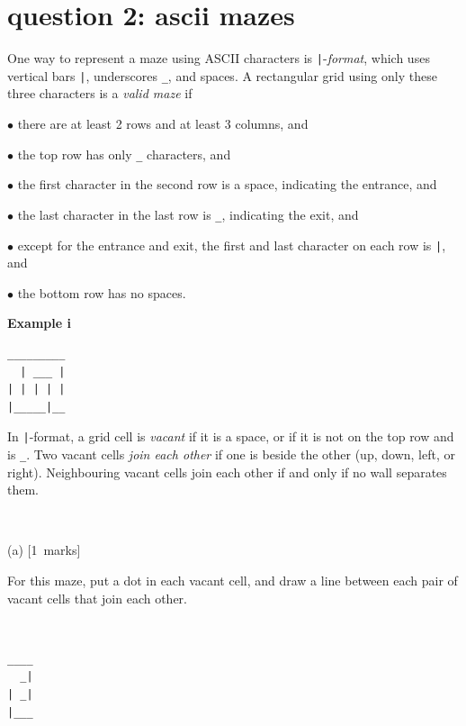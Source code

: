 \documentclass[12pt]{article}
\newcommand{\mymarks}[1]{\mbox{\small [#1 marks]}}
\begin{document}
\vfill
\vfill


\newpage
\section*{question 2: ascii mazes}

One way to represent a maze using ASCII characters is
\texttt{|}-{\em format}, which uses 
vertical bars \verb&|&, underscores \verb&_&, and spaces.
A rectangular grid using only these three 
characters is a {\em valid maze} if

$\bullet$ there are at least 2 rows and at least 3 columns, and

$\bullet$ the top row has only \verb&_& characters, and

$\bullet$ the first character in the second row 
is a space, indicating the entrance, and

$\bullet$ the last character in the last row is \verb&_&,
indicating the exit, and

$\bullet$ except for the entrance and exit,
the first and last character on each row is \verb&|&,  and

$\bullet$
the bottom row has no spaces.

\noindent
\begin{minipage}[c]{3cm}
{\bf Example i}
\end{minipage}
\begin{minipage}[c]{10cm}
\begin{verbatim}
_________
  | ___ |
| | | | |
|_____|__

\end{verbatim}
\end{minipage}

In \texttt{|}-format,
a grid cell is {\em vacant} if it is a space, or
if it is not on the top row and is \verb&_&. Two vacant cells 
{\em join each other}
if one is beside the other (up, down, left, or right).
Neighbouring vacant cells join each other if 
and only if no wall separates them.

~

\noindent
(a) \mymarks{1} ~ ~
\begin{minipage}[c]{11cm}
For this maze, put a dot in each vacant cell,
and draw a line between each pair of vacant cells that 
join each other.
\end{minipage} ~ ~
\begin{minipage}[c]{3cm}
{\large\begin{verbatim}
____
  _|
| _|
|___

\end{verbatim}}
\end{minipage}
\end{document}
